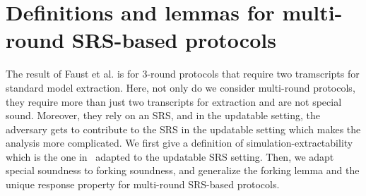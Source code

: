 \section{Definitions and lemmas for multi-round SRS-based protocols}
\label{sec:se_definitions}
The result of Faust et al.\cite{INDOCRYPT:FKMV12} is for $3$-round protocols that require two tramscripts for standard model extraction. Here, not only do we consider multi-round protocols, they require more than
just two transcripts for extraction and are not special
sound. Moreover, they rely on an SRS, and in the updatable setting, the adversary gets to contribute to the SRS in the updatable setting which makes the analysis more complicated.
We first give a definition of simulation-extractability which is the one in~\cite{INDOCRYPT:FKMV12} adapted to the updatable SRS setting. Then, we adapt special soundness to forking soundness, and generalize the forking lemma and the unique response property for
multi-round SRS-based protocols.

